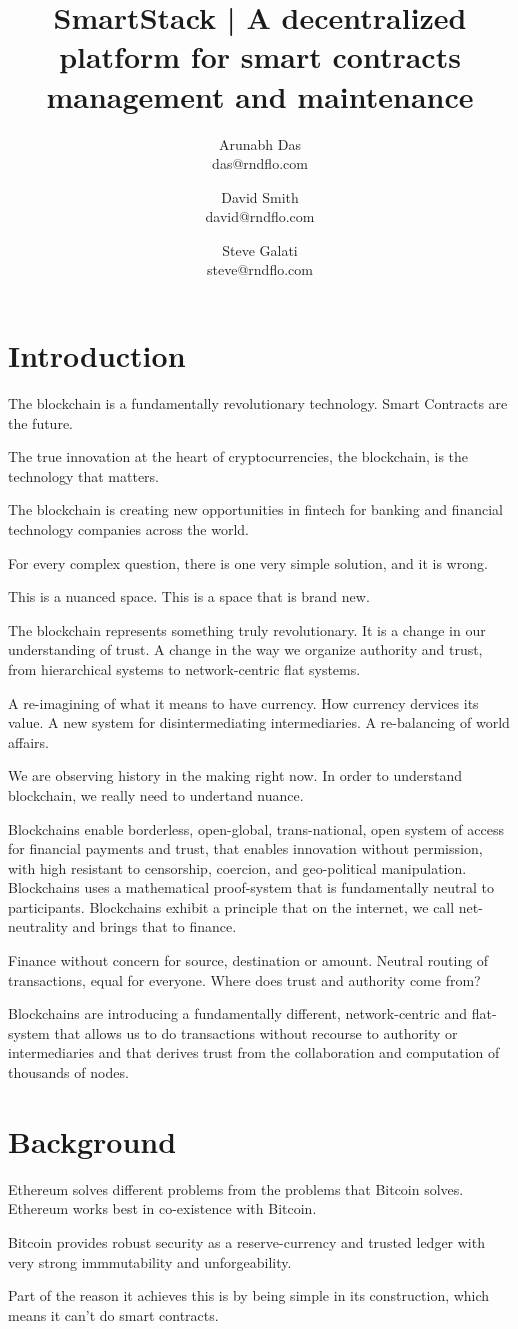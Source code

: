 \documentclass{article}
\author{Arunabh Das \\ {das@rndflo.com}
   \and David Smith \\ {david@rndflo.com} 
   \and Steve Galati \\ {steve@rndflo.com} }
\title{SmartStack | A decentralized platform for smart contracts management and maintenance}
\date{\vspace{-5ex}}
\begin{document}
\maketitle

\section{Introduction}

The blockchain is a fundamentally revolutionary technology. Smart Contracts are the future. 

The true innovation at the heart of cryptocurrencies, the blockchain, is the technology that matters.

The blockchain is creating new opportunities in fintech for banking and financial technology companies  across the world.

For every complex question, there is one very simple solution, and it is wrong.

This is a nuanced space. This is a space that is brand new.

The blockchain represents something truly revolutionary. It is a change in our understanding of trust. A change in the way we organize
authority and trust, from hierarchical systems to network-centric flat systems. 

A re-imagining of what it means to have currency. How currency dervices its value. A new system for disintermediating intermediaries. 
A re-balancing of world affairs.

We are observing history in the making right now. In order to understand blockchain, we really need to undertand nuance. 

Blockchains enable borderless, open-global, trans-national, open system of access for financial payments and trust, that enables innovation
without permission, with high resistant to censorship, coercion, and geo-political manipulation. Blockchains uses a mathematical proof-system
that is fundamentally neutral to participants. Blockchains exhibit a principle that on the internet, we call net-neutrality and brings that to 
finance.

Finance without concern for source, destination or amount. Neutral routing of transactions, equal for everyone. Where does trust and 
authority come from?

Blockchains are introducing a fundamentally different, network-centric and flat-system that allows us to do transactions without 
recourse to authority or intermediaries and that derives trust from the collaboration and computation of thousands of nodes.


\section{Background}
Ethereum solves different problems from the problems that Bitcoin solves. Ethereum works best in co-existence with Bitcoin. 

Bitcoin provides robust security as a reserve-currency and trusted ledger with very strong immmutability and unforgeability.

Part of the reason it achieves this is by being simple in its construction, which means it can't do smart contracts.
\end{document}
